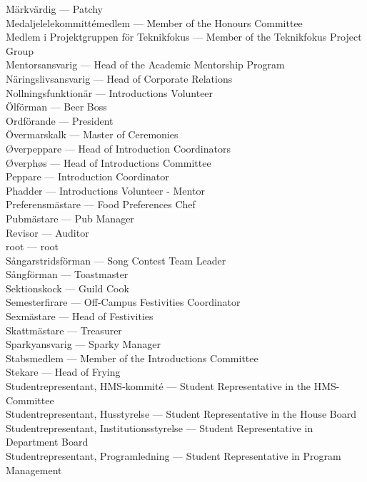 \documentclass{dsekkallelse}
\begin{document}
Märkvärdig ---	Patchy\\
Medaljelelekommittémedlem ---	Member of the Honours Committee\\
Medlem i Projektgruppen för Teknikfokus ---	Member of the Teknikfokus Project Group\\
Mentorsansvarig ---	Head of the Academic Mentorship Program\\
Näringslivsansvarig ---	Head of Corporate Relations\\
Nollningsfunktionär ---	Introductions Volunteer\\
Ölförman ---	Beer Boss\\
Ordförande ---	President\\
Övermarskalk ---	Master of Ceremonies\\
Øverpeppare ---	Head of Introduction Coordinators\\
Øverphøs ---	Head of Introductions Committee\\
Peppare ---	Introduction Coordinator\\
Phadder ---	Introductions Volunteer - Mentor\\
Preferensmästare ---	Food Preferences Chef\\
Pubmästare ---	Pub Manager\\
Revisor	 --- Auditor\\
root ---	root\\
Sångarstridsförman ---	Song Contest Team Leader\\
Sångförman ---	Toastmaster\\
Sektionskock ---	Guild Cook\\
Semesterfirare ---	Off-Campus Festivities Coordinator\\
Sexmästare ---	Head of Festivities\\
Skattmästare ---	Treasurer\\
Sparkyansvarig ---	Sparky Manager\\
Stabsmedlem ---	Member of the Introductions Committee\\
Stekare ---	Head of Frying\\
Studentrepresentant, HMS-kommité ---	Student Representative in the HMS-Committee\\
Studentrepresentant, Husstyrelse ---	Student Representative in the House Board\\
Studentrepresentant, Institutionsstyrelse ---	Student Representative in Department Board\\
Studentrepresentant, Programledning ---	Student Representative in Program Management\\
\end{document}

